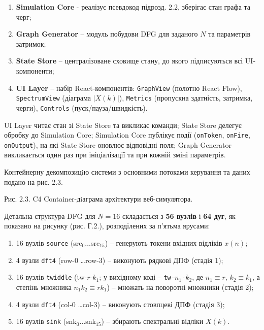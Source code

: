 \documentclass[
]{article}
\newcommand{\passthrough}[1]{#1}
\begin{document}
\begin{enumerate}
\def\labelenumi{\arabic{enumi})}
\item
  \textbf{Simulation Core} - реалізує псевдокод підрозд. 2.2, зберігає
  стан графа та черг;
\item
  \textbf{Graph Generator} -- модуль побудови DFG для заданого \(N\) та
  параметрів затримок;
\item
  \textbf{State Store} -- централізоване сховище стану, до якого
  підписуються всі UI-компоненти;
\item
  \textbf{UI Layer} -- набір React-компонентів:
  \passthrough{\lstinline!GraphView!} (полотно React Flow),
  \passthrough{\lstinline!SpectrumView!} (діаграма \(|X(k)|\)),
  \passthrough{\lstinline!Metrics!} (пропускна здатність, затримка,
  черги), \passthrough{\lstinline!Controls!} (пуск/пауза/швидкість).
\end{enumerate}

UI Layer читає стан зі State Store та викликає команди; State Store
делегує обробку до Simulation Core; Simulation Core публікує події
(\passthrough{\lstinline!onToken!}, \passthrough{\lstinline!onFire!},
\passthrough{\lstinline!onOutput!}), на які State Store оновлює
відповідні поля; Graph Generator викликається один раз при ініціалізації
та при кожній зміні параметрів.

Контейнерну декомпозицiю системи з основними потоками керування та даних
подано на рис. 2.3.



Рис. 2.3. C4 Container-дiаграма архiтектури веб-симулятора.

Детальна структура DFG для \(N = 16\) складається з \textbf{56 вузлів} і
\textbf{64 дуг}, як показано на рисунку (рис. Г.2.), розподілених за
п'ятьма ярусами:

\begin{enumerate}
\def\labelenumi{\arabic{enumi})}
\item
  16 вузлів \passthrough{\lstinline!source!}
  (src\(_{0}\ldots\)src\(_{15}\)) -- генерують токени вхідних відліків
  \(x(n)\);
\item
  4 вузли \passthrough{\lstinline!dft!}\passthrough{\lstinline!4!}
  (row-0 \ldots row-3) -- виконують рядкові ДПФ (стадія 1);
\item
  16 вузлів \passthrough{\lstinline!twiddle!} (tw-\(r\)-\(k_{1}\); у
  вихідному коді --
  \passthrough{\lstinline!tw!}\passthrough{\lstinline!-!}\(n_{1}\)\passthrough{\lstinline!-!}\(k_{2}\),
  де \(n_{1} \equiv r\), \(k_{2} \equiv k_{1}\), а степінь множника
  \(n_{1}k_{2} \equiv rk_{1}\)) -- множать на поворотні множники (стадія
  2);
\item
  4 вузли \passthrough{\lstinline!dft!}\passthrough{\lstinline!4!}
  (col-0 \ldots col-3) -- виконують стовпцеві ДПФ (стадія 3);
\item
  16 вузлів \passthrough{\lstinline!sink!}
  (snk\(_{0}\ldots\)snk\(_{15}\)) -- збирають спектральні відліки
  \(X(k)\).
\end{enumerate}
\end{document}
